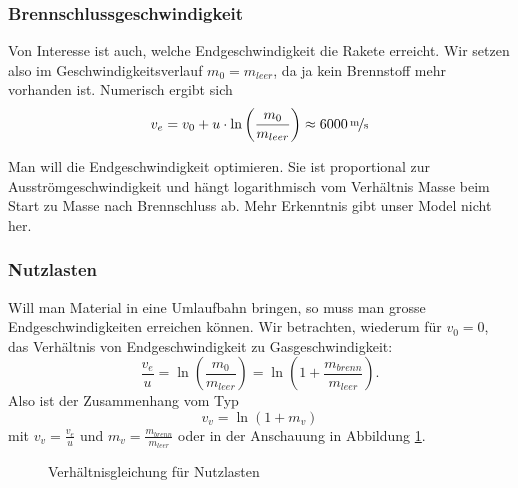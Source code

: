 \documentclass[%
draft,
11pt,%
twoside,%
titlepage,%
german,%
headsepline%
]{scrartcl}
\begin{document}
\subsubsection{Brennschlussgeschwindigkeit}

Von Interesse ist auch, welche Endgeschwindigkeit die Rakete erreicht. Wir setzen also im Geschwindigkeitsverlauf $m_0=m_{leer}$, da ja kein Brennstoff mehr vorhanden ist. Numerisch ergibt sich
$$v_e=v_0+u\cdot\ln\left(\frac{m_0}{m_{leer}}\right)\approx\unitfrac[6000]{m}{s}$$

Man will die Endgeschwindigkeit optimieren. Sie ist proportional zur Ausstr\"omgeschwindigkeit und h\"angt logarithmisch vom Verh\"altnis Masse beim Start zu Masse nach Brennschluss ab. Mehr Erkenntnis gibt unser Model nicht her.

\subsubsection{Nutzlasten}

Will man Material in eine Umlaufbahn bringen, so muss man grosse Endgeschwindigkeiten erreichen k\"onnen. Wir betrachten, wiederum f\"ur $v_0=0$, das Verh\"altnis von Endgeschwindigkeit zu Gasgeschwindigkeit:
$$\frac{v_e}{u}=\ln\left(\frac{m_0}{m_{leer}}\right)=\ln\left(1+\frac{m_{brenn}}{m_{leer}}\right).$$
Also ist der Zusammenhang vom Typ
$$v_v=\ln(1+m_v)$$
mit $v_v=\frac{v_e}{u}$ und $m_v=\frac{m_{brenn}}{m_{leer}}$ oder in der Anschauung in Abbildung \ref{raketeverhaeltnis}.

\begin{figure}
\begin{center}
\end{center}
\caption{Verh\"altnisgleichung f\"ur Nutzlasten}\label{raketeverhaeltnis}
\end{figure}
\end{document}
